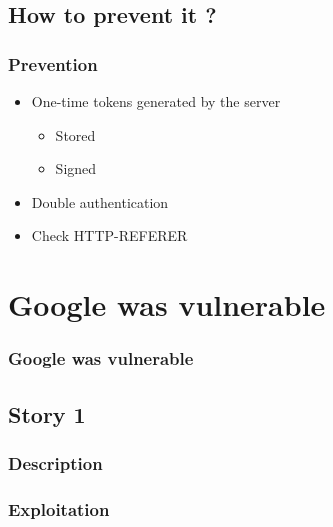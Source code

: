\documentclass[svgnames]{beamer}
\begin{document}
\subsection{How to prevent it ?}
\begin{frame}
  \frametitle{Prevention} %
  \begin{itemize}
   \item One-time tokens generated by the server
   \begin{itemize}
    \item Stored  %
    \item Signed  %
   \end{itemize}
   \item Double authentication %
   \item Check HTTP-REFERER %

  \end{itemize}

\end{frame}




\section{Google was vulnerable}
\begin{frame}
  \frametitle{Google was vulnerable}
  \tableofcontents[currentsection]
\end{frame}

\subsection{Story 1} %

\begin{frame}
  \frametitle{Description}
\end{frame}

\begin{frame}
  \frametitle{Exploitation}
\end{frame}
\end{document}
